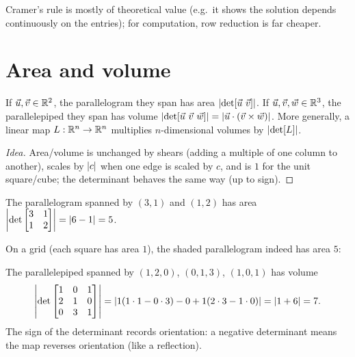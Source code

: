 Cramer's rule is mostly of theoretical value (e.g.\ it shows the solution depends continuously on the
entries); for computation, row reduction is far cheaper.

\section{Area and volume}

\begin{theorem}
If $\vec u,\vec v\in\mathbb{R}^2$, the parallelogram they span has area $\left\lvert \det[\vec u\ \vec v] \right\rvert$. If
$\vec u,\vec v,\vec w\in\mathbb{R}^3$, the parallelepiped they span has volume $\left\lvert \det[\vec u\ \vec v\ \vec w] \right\rvert
=\left\lvert \vec u\cdot(\vec v\times\vec w) \right\rvert$. More generally, a linear map $L:\mathbb{R}^n\to\mathbb{R}^n$ multiplies
$n$-dimensional volumes by $\left\lvert \det[L] \right\rvert$.
\end{theorem}
\begin{proof}[Idea]
Area/volume is unchanged by shears (adding a multiple of one column to another), scales by $\left\lvert c \right\rvert$ when one
edge is scaled by $c$, and is $1$ for the unit square/cube; the determinant behaves the same way (up to sign).
\end{proof}

\begin{example}
The parallelogram spanned by $(3,1)$ and $(1,2)$ has area $\left\lvert \det\begin{bmatrix}3&1\\1&2\end{bmatrix} \right\rvert=\left\lvert 6-1 \right\rvert=5$.

On a grid (each square has area $1$), the shaded parallelogram indeed has area $5$:
\begin{center}
\end{center}
The parallelepiped spanned by $(1,2,0)$, $(0,1,3)$, $(1,0,1)$ has volume
\[
\left\lvert \det\begin{bmatrix}1&0&1\\2&1&0\\0&3&1\end{bmatrix} \right\rvert
=\left\lvert 1(1\cdot1-0\cdot3)-0+1(2\cdot3-1\cdot0) \right\rvert=\left\lvert 1+6 \right\rvert=7.
\]
The sign of the determinant records orientation: a negative determinant means the map reverses
orientation (like a reflection).
\end{example}

